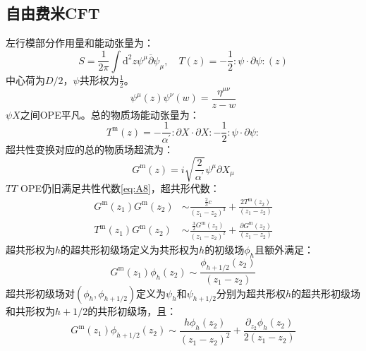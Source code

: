 \subsection{自由费米CFT}
左行模部分作用量和能动张量为：
\begin{equation}
S=\frac{1}{2\pi}\int\mathrm{d}^2z\psi^\mu\overline{\partial}\psi_\mu	,\quad T(z) = -\frac{1}{2}:\psi\cdot\partial\psi:(z)
\end{equation}
中心荷为$D/2$，$\psi$共形权为$\frac12$。
\begin{equation}
	\psi^\mu(z)\psi^\nu(w) = \frac{\eta^{\mu\nu}}{z-w}
\end{equation}
$\psi X$之间OPE平凡。总的物质场能动张量为：
\begin{equation}
	T^\mathrm{m}(z)=-\frac{1}{\alpha^{\prime}}:\partial X\cdot\partial X:-\frac{1}{2}:\psi\cdot\partial\psi:
\end{equation}
超共性变换对应的总的物质场超流为：
\begin{equation}
	G^\mathrm{m}(z)=i\sqrt{\frac{2}{\alpha^{\prime}}}\psi^\mu\partial X_\mu
\end{equation}
$TT$ OPE仍旧满足共性代数\ref{eq:A8}，超共形代数：
\begin{equation}
	\label{eq:A19}
	\begin{aligned}
		G^\mathrm{m}(z_1)G^\mathrm{m}(z_2)&\sim\frac{\frac{2}{3}c}{(z_1-z_2)^3}+\frac{2T^\mathrm{m}(z_2)}{(z_1-z_2)}\\
T^\mathrm{m}(z_1)G^\mathrm{m}(z_2)&\sim\frac{\frac{3}{2}G^\mathrm{m}(z_2)}{(z_1-z_2)^2}+\frac{\partial G^\mathrm{m}(z_2)}{(z_1-z_2)}
	\end{aligned}
\end{equation}
超共形权为$h$的超共形初级场定义为共形权为$h$的初级场$\phi_h$且额外满足：
\begin{equation}
	\label{eq:A20}
	G^\mathrm{m}(z_1)\phi_h(z_2)\sim\frac{\phi_{h+1/2}(z_2)}{(z_1-z_2)}
\end{equation}
超共形初级场对$(\phi_h,\phi_{h+1/2})$定义为$\psi_h$和$\psi_{h+1/2}$分别为超共形权$h$的超共形初级场和共形权为$h+1/2$的共形初级场，且：
\begin{equation}
	\label{eq:A21}
	G^\mathrm{m}(z_1)\phi_{h+1/2}(z_2)\sim\frac{h\phi_h(z_2)}{(z_1-z_2)^2}+\frac{\partial_{z_2}\phi_h(z_2)}{2(z_1-z_2)}
\end{equation}
